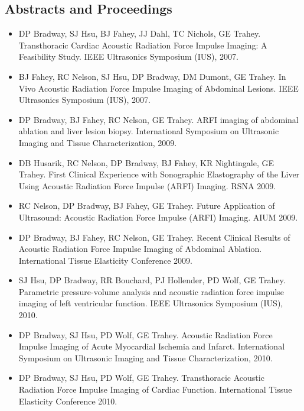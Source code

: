 \documentclass[letterpaper,10pt,english]{sphinxmanual}
\begin{document}
\subsection{Abstracts and Proceedings}
\label{resume:abstracts-and-proceedings}\begin{itemize}
\item {} 
DP Bradway, SJ Hsu, BJ Fahey, JJ Dahl, TC Nichols, GE Trahey.
Transthoracic Cardiac Acoustic Radiation Force Impulse Imaging: A
Feasibility Study. IEEE Ultrasonics Symposium (IUS), 2007.

\item {} 
BJ Fahey, RC Nelson, SJ Hsu, DP Bradway, DM Dumont, GE Trahey. In
Vivo Acoustic Radiation Force Impulse Imaging of Abdominal Lesions.
IEEE Ultrasonics Symposium (IUS), 2007.

\item {} 
DP Bradway, BJ Fahey, RC Nelson, GE Trahey. ARFI imaging of abdominal
ablation and liver lesion biopsy. International Symposium on
Ultrasonic Imaging and Tissue Characterization, 2009.

\item {} 
DB Husarik, RC Nelson, DP Bradway, BJ Fahey, KR Nightingale, GE
Trahey. First Clinical Experience with Sonographic Elastography of
the Liver Using Acoustic Radiation Force Impulse (ARFI) Imaging. RSNA
2009.

\item {} 
RC Nelson, DP Bradway, BJ Fahey, GE Trahey. Future Application of
Ultrasound: Acoustic Radiation Force Impulse (ARFI) Imaging. AIUM
2009.

\item {} 
DP Bradway, BJ Fahey, RC Nelson, GE Trahey. Recent Clinical Results
of Acoustic Radiation Force Impulse Imaging of Abdominal Ablation.
International Tissue Elasticity Conference 2009.

\item {} 
SJ Hsu, DP Bradway, RR Bouchard, PJ Hollender, PD Wolf, GE Trahey.
Parametric pressure-volume analysis and acoustic radiation force
impulse imaging of left ventricular function. IEEE Ultrasonics
Symposium (IUS), 2010.

\item {} 
DP Bradway, SJ Hsu, PD Wolf, GE Trahey. Acoustic Radiation Force
Impulse Imaging of Acute Myocardial Ischemia and Infarct.
International Symposium on Ultrasonic Imaging and Tissue
Characterization, 2010.

\item {} 
DP Bradway, SJ Hsu, PD Wolf, GE Trahey. Transthoracic Acoustic
Radiation Force Impulse Imaging of Cardiac Function. International
Tissue Elasticity Conference 2010.


\end{itemize}
\end{document}
